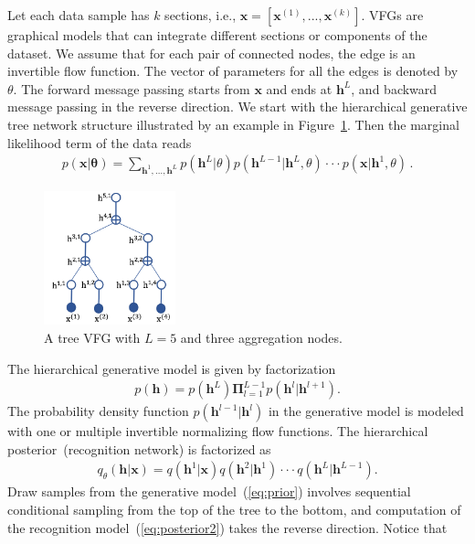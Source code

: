 \documentclass[sigconf, anonymous, review]{acmart}
\theoremstyle{plain}
\theoremstyle{definition}
\theoremstyle{remark}
\begin{document}
Let each data sample has $k$ sections, i.e., $\mathbf{x} = [\mathbf{x}^{(1)}, ..., \mathbf{x}^{(k)}]$. VFGs are graphical models that can integrate different sections or components of the dataset.  We assume that for each pair of connected nodes, the edge is an invertible flow function. 
The vector of parameters for all the edges is denoted by $\theta$. 
The forward message passing starts from $\mathbf{x}$ and ends at $\mathbf{h}^L$, and backward message passing in the reverse direction. We start with the hierarchical generative tree network structure illustrated by an example in Figure~\ref{fig:tree_vfg}. 
Then the marginal likelihood term of the data reads
\begin{align*}
p(\mathbf{x}| \mathbf{\theta}) = \sum_{\mathbf{h}^1, ..., \mathbf{h}^L} p(\mathbf{h}^L | \theta)p(\mathbf{h}^{L-1} | \mathbf{h}^{L},\theta) \cdot \cdot  \cdot  p(\mathbf{x} | \mathbf{h}^{1}, \theta) \, .
\end{align*}
\begin{figure}[H]
    \centering
    \includegraphics[width=1.5in]{fig/tree_vfg.png}
    \caption{A  tree VFG with $L=5$ and three aggregation nodes.}
    \label{fig:tree_vfg}
\end{figure}
\noindent The hierarchical generative model is given by factorization
\begin{align}\label{eq:prior}
p(\mathbf{h}) =  p( \mathbf{h}^{L})\mathbf{\Pi}_{l=1}^{L-1}p(\mathbf{h}^{l} | \mathbf{h}^{l+1}) .
\end{align}
The probability density function $p(\mathbf{h}^{l-1} | \mathbf{h}^{l})$ in the generative model is modeled with one or multiple invertible normalizing flow functions. The hierarchical posterior~(recognition network) is factorized as
\begin{align}\label{eq:posterior2}
q_{\theta}(\mathbf{h}| \mathbf{x}) =  q(\mathbf{h}^1 | \mathbf{x})  q(\mathbf{h}^2 | \mathbf{h}^1) \cdot \cdot  \cdot  q(\mathbf{h}^{L} | \mathbf{h}^{L-1}).
\end{align}
Draw samples from the generative model~(\ref{eq:prior})
involves sequential conditional sampling from the top of the tree to the bottom, and computation of the recognition model~(\ref{eq:posterior2}) takes the reverse direction. Notice that
\end{document}
